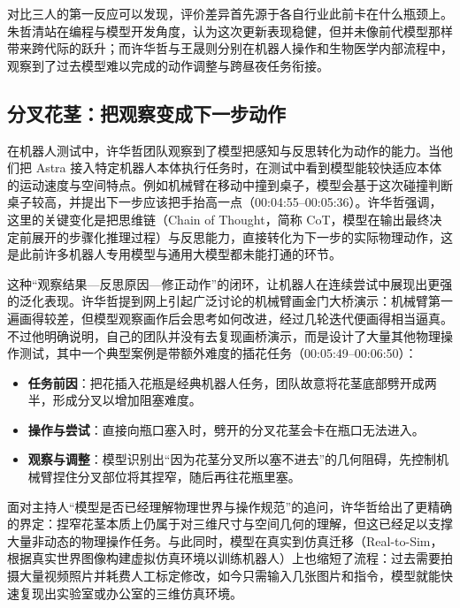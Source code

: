 \documentclass[UTF8,a4paper,11pt,fontset=fandol]{ctexart}
\begin{document}
对比三人的第一反应可以发现，评价差异首先源于各自行业此前卡在什么瓶颈上。朱哲清站在编程与模型开发角度，认为这次更新表现稳健，但并未像前代模型那样带来跨代际的跃升；而许华哲与王晟则分别在机器人操作和生物医学内部流程中，观察到了过去模型难以完成的动作调整与跨昼夜任务衔接。

\subsection{分叉花茎：把观察变成下一步动作}
在机器人测试中，许华哲团队观察到了模型把感知与反思转化为动作的能力。当他们把 Astra 接入特定机器人本体执行任务时，在测试中看到模型能较快适应本体的运动速度与空间特点。例如机械臂在移动中撞到桌子，模型会基于这次碰撞判断桌子较高，并提出下一步应该把手抬高一点（00:04:55–00:05:36）。许华哲强调，这里的关键变化是把思维链（Chain of Thought，简称 CoT，模型在输出最终决定前展开的步骤化推理过程）与反思能力，直接转化为下一步的实际物理动作，这是此前许多机器人专用模型与通用大模型都未能打通的环节。

这种“观察结果—反思原因—修正动作”的闭环，让机器人在连续尝试中展现出更强的泛化表现。许华哲提到网上引起广泛讨论的机械臂画金门大桥演示：机械臂第一遍画得较差，但模型观察画作后会思考如何改进，经过几轮迭代便画得相当逼真。不过他明确说明，自己的团队并没有去复现画桥演示，而是设计了大量其他物理操作测试，其中一个典型案例是带额外难度的插花任务（00:05:49–00:06:50）：

\begin{itemize}
\item \textbf{任务前因}：把花插入花瓶是经典机器人任务，团队故意将花茎底部劈开成两半，形成分叉以增加阻塞难度。
\item \textbf{操作与尝试}：直接向瓶口塞入时，劈开的分叉花茎会卡在瓶口无法进入。
\item \textbf{观察与调整}：模型识别出“因为花茎分叉所以塞不进去”的几何阻碍，先控制机械臂捏住分叉部位将其捏窄，随后再往花瓶里塞。
\end{itemize}

面对主持人“模型是否已经理解物理世界与操作规范”的追问，许华哲给出了更精确的界定：捏窄花茎本质上仍属于对三维尺寸与空间几何的理解，但这已经足以支撑大量非动态的物理操作任务。与此同时，模型在真实到仿真迁移（Real-to-Sim，根据真实世界图像构建虚拟仿真环境以训练机器人）上也缩短了流程：过去需要拍摄大量视频照片并耗费人工标定修改，如今只需输入几张图片和指令，模型就能快速复现出实验室或办公室的三维仿真环境。
\end{document}

